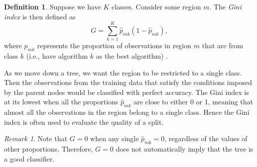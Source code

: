 \documentclass{l4proj}
\theoremstyle{definition}
\newtheorem{definition}{Definition}[chapter]
\theoremstyle{remark}
\newtheorem{remark}{Remark}[chapter]
\begin{document}
\begin{definition}
  Suppose we have $K$ classes. Consider some region $m$. The \emph{Gini index}
  is then defined as
  \[ G = \sum_{k=1}^K \hat{p}_{mk}(1-\hat{p}_{mk}), \]
  where $\hat{p}_{mk}$ represents the proportion of observations in region $m$
  that are from class $k$ (i.e., have algorithm $k$ as the best algorithm)
  \cite{James:2014:ISL:2517747}.
\end{definition}

As we move down a tree, we want the region to be restricted to a single class.
Then the observations from the training data that satisfy the conditions imposed
by the parent nodes would be classified with perfect accuracy. The Gini index is
at its lowest when all the proportions $\hat{p}_{mk}$ are close to either 0 or
1, meaning that almost all the observations in the region belong to a single
class. Hence the Gini index is often used to evaluate the quality of a split.

\begin{remark}
  Note that $G=0$ when any single $\hat{p}_{mk}=0$, regardless of the values of
  other proportions. Therefore, $G=0$ does not automatically imply that the tree
  is a good classifier.
\end{remark}
\end{document}
